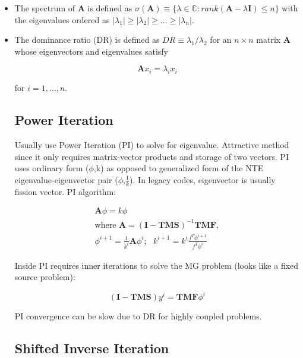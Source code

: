 \documentclass{article}
\begin{document}
\begin{itemize}

\item The spectrum of $\mathbf{A}$ is defined as $\sigma(\mathbf{A}) \equiv \{ \lambda \in \mathbb{C}: rank(\mathbf{A} - \lambda \mathbf{I}) \leq n \}$ with the eigenvalues ordered as $\lvert\lambda_1 \rvert \geq \lvert \lambda_2 \rvert \geq \ldots \geq \lvert \lambda_n \rvert$.

\item The dominance ratio (DR) is defined as $ DR \equiv \lambda_1 / \lambda_2$ for an $n \times n$ matrix $\mathbf{A}$ whose eigenvectors and eigenvalues satisfy

\begin{equation*}
\mathbf{A} x_i = \lambda_i x_i
\end{equation*}

for $i = 1,\ldots,n$.

\subsection*{Power Iteration}

Usually use Power Iteration (PI) to solve for eigenvalue. Attractive method since it only requires matrix-vector products and storage of two vectors. PI uses ordinary form ($\phi$,k) as opposed to generalized form of the NTE eigenvalue-eigenvector pair ($\phi$,$\frac{1}{k}$). In legacy codes, eigenvector is usually fission vector. PI algorithm:

\begin{equation*}
\begin{split}
\mathbf{A}\phi = k \phi \\
\text{where } \mathbf{A} = (\mathbf{I} - \mathbf{TMS})^{-1}\mathbf{TMF}, \\
\phi^{i+1} = \frac{1}{k^i} \mathbf{A} \phi^{i};\text{			}k^{i+1} = k^{i} \frac{f^T \phi^{i+1}}{f^{T}\phi^i}
\end{split}
\end{equation*}

Inside PI requires inner iterations to solve the MG problem (looks like a fixed source problem):

\begin{equation*}
(\mathbf{I} - \mathbf{TMS}) y^i = \mathbf{TMF}\phi^i
\end{equation*}

PI convergence can be slow due to DR for highly coupled problems. 

\subsection*{Shifted Inverse Iteration}


\end{itemize}
\end{document}
